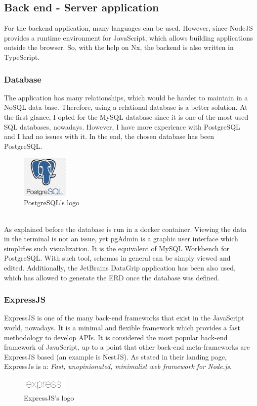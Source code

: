 \documentclass[a4paper, 12pt, oneside]{book}
\begin{document}
\subsection{Back end - Server application}
For the backend application, many languages can be used. However, since NodeJS provides a runtime environment for JavaScript, which allows building applications outside the browser. So, with the help on Nx, the backend is also written in TypeScript.
\subsubsection{Database}
The application has many relationships, which would be harder to maintain in a NoSQL data-base. Therefore, using a relational database is a better solution. At the first glance, I opted for the MySQL database since it is one of the most used SQL databases, nowadays. However, I have more experience with PostgreSQL and I had no issues with it. In the end, the chosen database has been PostgreSQL.
\\
\begin{figure}[h!]
	\centering
	\includegraphics[width=0.2\textwidth]{assets/postgres-logo.png}
	\caption{PostgreSQL's logo}
\end{figure}
\\
As explained before the database is run in a docker container. Viewing the data in the terminal is not an issue, yet pgAdmin is a graphic user interface which simplifies such visualization. It is the equivalent of MySQL Workbench for PostgreSQL. With such tool, schemas in general can be simply viewed and edited. Additionally, the JetBrains DataGrip application has been also used, which has allowed to generate the ERD once the database was defined.
\subsubsection{ExpressJS}
ExpressJS is one of the many back-end frameworks that exist in the JavaScript world, nowadays. It is a minimal and flexible framework which provides a fast methodology to develop APIs. It is considered the most popular back-end framework of JavaScript, up to a point that other back-end meta-frameworks are ExpressJS based (an example is NestJS). As stated in their landing page, ExpressJs is a: \emph{Fast, unopinionated, minimalist web framework for Node.js}.
\\
\begin{figure}[h!]
	\centering
	\includegraphics[width=0.2\textwidth]{assets/express-logo.png}
	\caption{ExpressJS's logo}
\end{figure}
\end{document}
